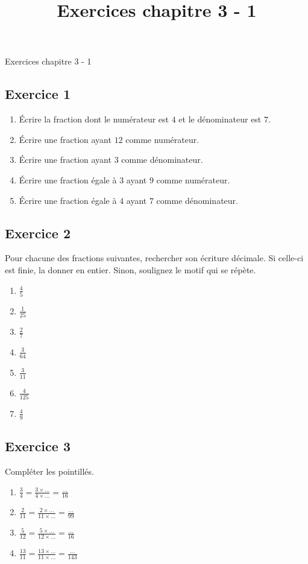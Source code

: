 \documentclass[14 pt]{extarticle}
\title{Exercices chapitre 3 - 1}
\date{}
\theoremstyle{plain}
\begin{document}
\begin{center}{\Large Exercices chapitre 3 - 1}\\ 
 \end{center}
 \subsection*{Exercice 1}
 

\begin{enumerate}
\item Écrire la fraction dont le numérateur est $4$ et le dénominateur est $7$.
\item Écrire une fraction ayant $12$ comme numérateur. 
\item Écrire une fraction ayant $3$ comme dénominateur. 
\item Écrire une fraction égale à $3$ ayant $9$ comme numérateur. 
\item Écrire une fraction égale à $4$ ayant $7$ comme dénominateur.
\end{enumerate}

\subsection*{Exercice 2 }
Pour chacune des fractions suivantes, 
rechercher son écriture décimale. Si celle-ci est finie, la donner en entier. Sinon, soulignez le motif qui se répète. 

\begin{enumerate}
\item $\frac45$
\item $\frac1{25}$ 
\item $\frac{2}{7}$
\item $\frac3{64}$ 
\item $\frac{3}{11}$
\item $\frac4{125}$ 
\item $\frac{4}{9}$
\end{enumerate}
\subsection*{Exercice 3}

Compléter les pointillés. 

\begin{enumerate}
\item $\frac34= \frac{3 \times \ldots}{4 \times \ldots}= 
\frac{\ldots}{16}$
\item $\frac2{11}= \frac{2 \times \ldots}{11 \times \ldots}= 
\frac{\ldots}{99}$
\item $\frac5{12}=  \frac{5 \times \ldots}{12 \times \ldots}= 
\frac{\ldots}{16}$
\item $\frac{13}{11}=  \frac{13 \times \ldots}{11 \times \ldots}= 
\frac{\ldots}{143}$
\end{enumerate}
\end{document}
